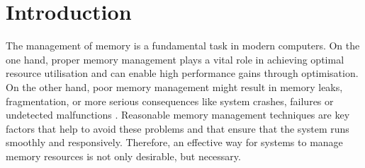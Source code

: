 \chapter{Introduction}
\label{chap:introduction}

The management of memory is a fundamental task in modern computers.
On the one hand, proper memory management plays a vital role in achieving optimal resource utilisation and can enable high performance gains through optimisation.
On the other hand, poor memory management might result in memory leaks, fragmentation, or more serious consequences like system crashes, failures or undetected malfunctions \cite{mm-study2016}.
Reasonable memory management techniques are key factors that help to avoid these problems and that ensure that the system runs smoothly and responsively.
Therefore, an effective way for systems to manage memory resources is not only desirable, but necessary.

